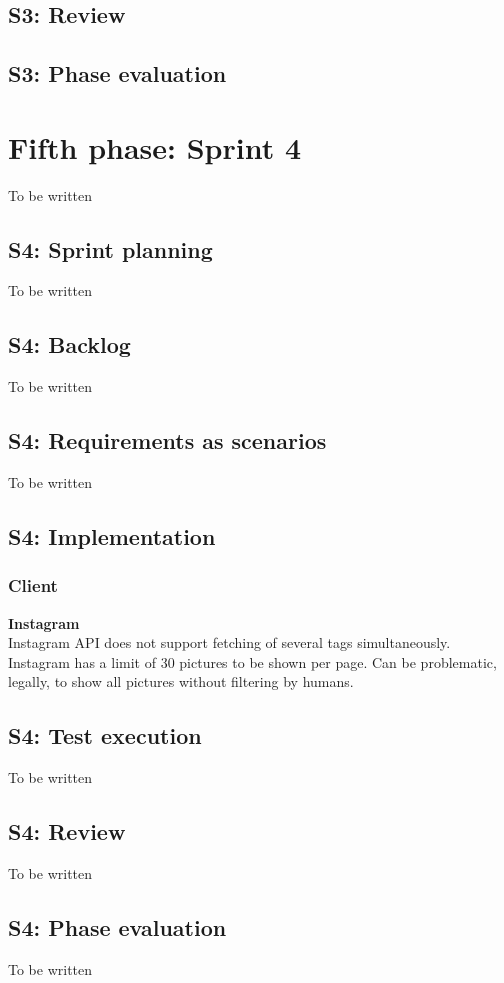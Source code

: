 \documentclass[11pt]{book}
\begin{document}
\subsection{S3: Review}
\subsection{S3: Phase evaluation}

\section{Fifth phase: Sprint 4}
To be written
\subsection{S4: Sprint planning}
To be written
\subsection{S4: Backlog}
To be written
\subsection{S4: Requirements as scenarios}
To be written
\subsection{S4: Implementation}

\subsubsection{Client}
\textbf{Instagram}\\
Instagram API does not support fetching of several tags simultaneously.
Instagram has a limit of 30 pictures to be shown per page. 
Can be problematic, legally, to show all pictures without filtering by humans.

\subsection{S4: Test execution}
To be written
\subsection{S4: Review}
To be written
\subsection{S4: Phase evaluation}
To be written
\end{document}
